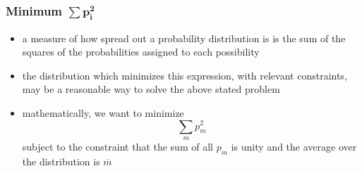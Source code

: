 \documentclass[../jaynes_prob_theory_notes.tex]{subfiles}
\begin{document}
            \subsubsection{Minimum $\mathbf{\sum p^{2}_{i}}$}
                \begin{itemize} 
                    \item a measure of how spread out a probability distribution is is the sum of the squares of the probabilities assigned to each possibility
                    \item the distribution which minimizes this expression, with relevant constraints, may be a reasonable way to solve the above stated problem
                    \item mathematically, we want to minimize
                        \begin{equation}
                            \label{min_var}
                            \sum\limits_{m} p^{2}_{m}
                        \end{equation}
                        subject to the constraint that the sum of all $p_m$ is unity and the average over the distribution is $\overline{m}$


\end{itemize}
\end{document}
